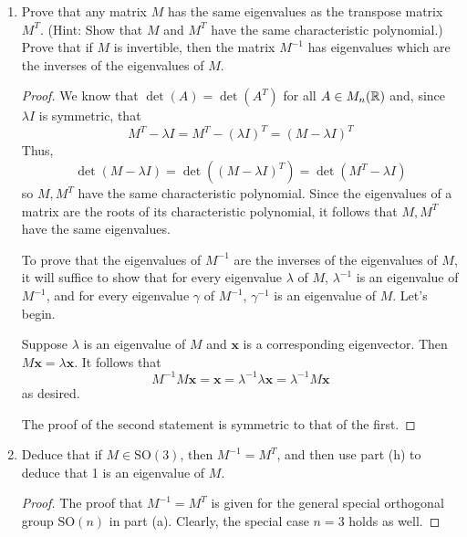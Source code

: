 \documentclass[../psets.tex]{subfiles}
\begin{document}
\begin{enumerate}
\begin{enumerate}
        \item Prove that any matrix $M$ has the same eigenvalues as the transpose matrix $M^T$. (Hint: Show that $M$ and $M^T$ have the same characteristic polynomial.) Prove that if $M$ is invertible, then the matrix $M^{-1}$ has eigenvalues which are the inverses of the eigenvalues of $M$.
        \begin{proof}
            We know that $\det(A)=\det(A^T)$ for all $A\in M_n(\mathbb{R})$ and, since $\lambda I$ is symmetric, that
            \begin{equation*}
                M^T-\lambda I = M^T-(\lambda I)^T
                = (M-\lambda I)^T
            \end{equation*}
            Thus,
            \begin{equation*}
                \det(M-\lambda I) = \det((M-\lambda I)^T)
                = \det(M^T-\lambda I)
            \end{equation*}
            so $M,M^T$ have the same characteristic polynomial. Since the eigenvalues of a matrix are the roots of its characteristic polynomial, it follows that $M,M^T$ have the same eigenvalues.\par\smallskip
            To prove that the eigenvalues of $M^{-1}$ are the inverses of the eigenvalues of $M$, it will suffice to show that for every eigenvalue $\lambda$ of $M$, $\lambda^{-1}$ is an eigenvalue of $M^{-1}$, and for every eigenvalue $\gamma$ of $M^{-1}$, $\gamma^{-1}$ is an eigenvalue of $M$. Let's begin.\par
            Suppose $\lambda$ is an eigenvalue of $M$ and $\mathbf{x}$ is a corresponding eigenvector. Then $M\mathbf{x}=\lambda\mathbf{x}$. It follows that
            \begin{equation*}
                M^{-1}M\mathbf{x} = \mathbf{x}
                = \lambda^{-1}\lambda\mathbf{x}
                = \lambda^{-1}M\mathbf{x}
            \end{equation*}
            as desired.\par
            The proof of the second statement is symmetric to that of the first.
        \end{proof}
        \item Deduce that if $M\in\text{SO}(3)$, then $M^{-1}=M^T$, and then use part (h) to deduce that 1 is an eigenvalue of $M$.
        \begin{proof}
            The proof that $M^{-1}=M^T$ is given for the general special orthogonal group $\text{SO}(n)$ in part (a). Clearly, the special case $n=3$ holds as well.\par

\end{proof}
\end{enumerate}
\end{enumerate}
\end{document}
